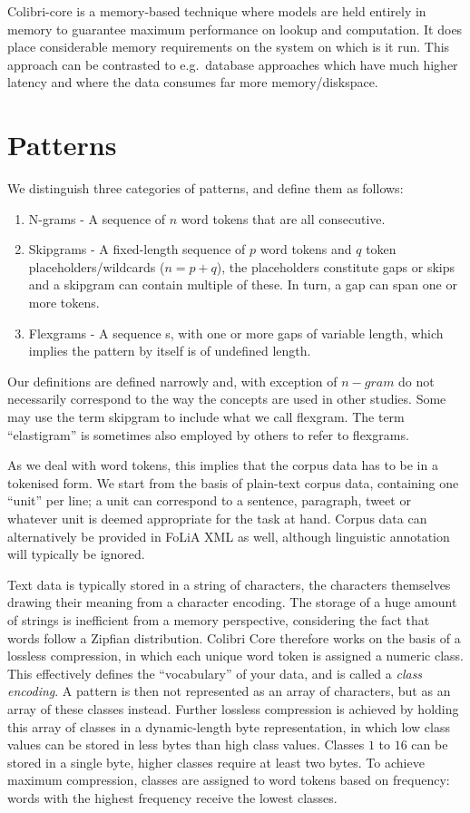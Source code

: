 Colibri-core is a memory-based technique where models are held entirely in
memory to guarantee maximum performance on lookup and computation. It does
place considerable memory requirements on the system on which is it run. This
approach can be contrasted to e.g.\ database approaches which have much higher
latency and where the data consumes far more memory/diskspace.

\section{Patterns}

We distinguish three categories of patterns, and define them as follows:

\begin{enumerate}
    \item N-grams - A sequence of $n$ word tokens that are all consecutive.
    \item Skipgrams - A fixed-length sequence of $p$ word tokens and $q$ token placeholders/wildcards ($n=p+q$), the placeholders constitute gaps or skips and a skipgram can contain multiple of these. In turn, a gap can span one or more tokens. 
    \item Flexgrams - A sequence s, with one or more gaps of variable length, which implies the pattern by itself is of undefined length.
\end{enumerate}

Our definitions are defined narrowly and, with exception of $n-gram$ do not
necessarily correspond to the way the concepts are used in other studies. Some
may use the term skipgram to include what we call flexgram.  The term
``elastigram'' is sometimes also employed by others to refer to flexgrams. 

As we deal with word tokens, this implies that the corpus data has to be in a
tokenised form. We start from the basis of plain-text corpus data, containing one
``unit'' per line; a unit can correspond to a sentence, paragraph, tweet
or whatever unit is deemed appropriate for the task at hand. Corpus data can
alternatively be provided in FoLiA XML \cite{TODO} as well, although linguistic
annotation will typically be ignored.

Text data is typically stored in a string of characters, the
characters themselves drawing their meaning from a character encoding. The
storage of a huge amount of strings is inefficient from a memory perspective,
considering the fact that words follow a Zipfian distribution. Colibri Core
therefore works on the basis of a lossless compression, in which each unique
word token is assigned a numeric class. This effectively defines the
``vocabulary'' of your data, and is called a \emph{class encoding}. A pattern
is then not represented as an array of characters, but as an array of these
classes instead. Further lossless compression is achieved by holding this array
of classes in a dynamic-length byte representation, in which low class values
can be stored in less bytes than high class values. Classes $1$ to $16$ can be
stored in a single byte, higher classes require at least two bytes. To achieve
maximum compression, classes are assigned to word tokens based on frequency:
words with the highest frequency receive the lowest classes.

